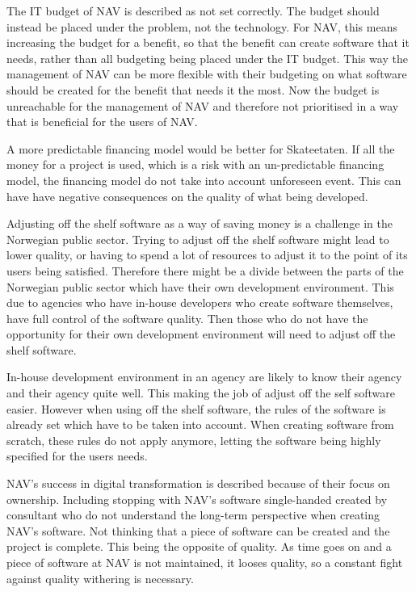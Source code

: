 The IT budget of NAV is described as not set correctly. The budget should instead be placed under the problem, not the technology. For NAV, this means increasing the budget for a benefit, so that the benefit can create software that it needs, rather than all budgeting being placed under the IT budget. This way the management of NAV can be more flexible with their budgeting on what software should be created for the benefit that needs it the most. Now the budget is unreachable for the management of NAV and therefore not prioritised in a way that is beneficial for the users of NAV.

A more predictable financing model would be better for Skateetaten. If all the money for a project is used, which is a risk with an un-predictable financing model, the financing model do not take into account unforeseen event. This can have have negative consequences on the quality of what being developed.

Adjusting off the shelf software as a way of saving money is a challenge in the Norwegian public sector. Trying to adjust off the shelf software might lead to lower quality, or having to spend a lot of resources to adjust it to the point of its users being satisfied. Therefore there might be a divide between the parts of the Norwegian public sector which have their own development environment. This due to agencies who have in-house developers who create software themselves, have full control of the software quality. Then those who do not have the opportunity for their own development environment will need to adjust off the shelf software.

In-house development environment in an agency are likely to know their agency and their agency quite well. This making the job of adjust off the self software easier. However when using off the shelf software, the rules of the software is already set which have to be taken into account. When creating software from scratch, these rules do not apply anymore, letting the software being highly specified for the users needs.

NAV's success in digital transformation is described because of their focus on ownership. Including stopping with NAV's software single-handed created by consultant who do not understand the long-term perspective when creating NAV's software. Not thinking that a piece of software can be created and the project is complete. This being the opposite of quality. As time goes on and a piece of software at NAV is not maintained, it looses quality, so a constant fight against quality withering is necessary.

